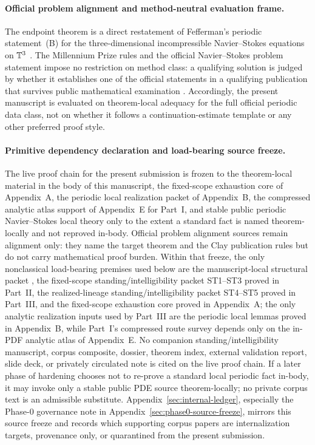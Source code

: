 \paragraph{Official problem alignment and method-neutral evaluation frame.}
The endpoint theorem is a direct restatement of Fefferman's periodic statement~(B) for the three-dimensional incompressible Navier--Stokes equations on $\mathbb{T}^3$ \cite{fefferman-navierstokes-problem}. The Millennium Prize rules and the official Navier--Stokes problem statement impose no restriction on method class: a qualifying solution is judged by whether it establishes one of the official statements in a qualifying publication that survives public mathematical examination \cite{cmi-millennium-rules}. Accordingly, the present manuscript is evaluated on theorem-local adequacy for the full official periodic data class, not on whether it follows a continuation-estimate template or any other preferred proof style.

\paragraph{Primitive dependency declaration and load-bearing source freeze.}
The live proof chain for the present submission is frozen to the theorem-local material in the body of this manuscript, the fixed-scope exhaustion core of Appendix~A, the periodic local realization packet of Appendix~B, the compressed analytic atlas support of Appendix~E for Part~I, and stable public periodic Navier--Stokes local theory only to the extent a standard fact is named theorem-locally and not reproved in-body. Official problem alignment sources remain alignment only: they name the target theorem and the Clay publication rules but do not carry mathematical proof burden. Within that freeze, the only nonclassical load-bearing premises used below are the manuscript-local structural packet \StructuralPacketRef{}, the fixed-scope standing/intelligibility packet ST1--ST3 proved in Part~II, the realized-lineage standing/intelligibility packet ST4--ST5 proved in Part~III, and the fixed-scope exhaustion core proved in Appendix~A; the only analytic realization inputs used by Part~III are the periodic local lemmas proved in Appendix~B, while Part~I's compressed route survey depends only on the in-PDF analytic atlas of Appendix~E. No companion standing/intelligibility manuscript, corpus composite, dossier, theorem index, external validation report, slide deck, or privately circulated note is cited on the live proof chain. If a later phase of hardening chooses not to re-prove a standard local periodic fact in-body, it may invoke only a stable public PDE source theorem-locally; no private corpus text is an admissible substitute. Appendix~\ref{sec:internal-ledger}, especially the Phase-0 governance note in Appendix~\ref{sec:phase0-source-freeze}, mirrors this source freeze and records which supporting corpus papers are internalization targets, provenance only, or quarantined from the present submission.


